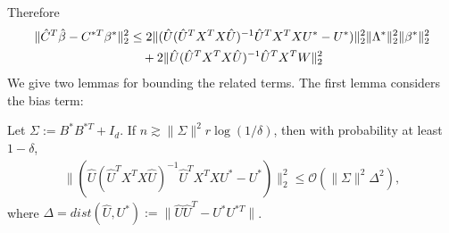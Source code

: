 Therefore 
\begin{align} \label{bias_variance_decom}
\|\hat{C}^{T}\hat{\beta}- C^{* T}\beta^{*}\|_{2}^{2} &\leq 2 \|(\hat{U}(\hat{U}^{T}X^{T}X\hat{U})^{-1}\hat{U}^{T}X^{T}X U^{*} - U^{*})\|_{2}^{2} \|\Lambda^{*}\|^2_2 \|\beta^{*}\|_{2}^{2}   \notag \\
& \quad + 2\|\hat{U}(\hat{U}^{T}X^{T}X\hat{U})^{-1}\hat{U}^{T}X^{T} W\|_{2}^{2}
\end{align}
We give two lemmas for bounding the related terms. The first lemma considers the bias term: 
\begin{lemma} \label{bias_term}
Let $\Sigma :=B^{*}B^{* T}+I_{d} $. If $n \gtrsim \|\Sigma\|^{2} r \log (1/\delta)$, then with probability at least $1-\delta$, 
\begin{align}
\|(\hat{U}(\hat{U}^{T}X^{T}X\hat{U})^{-1}\hat{U}^{T}X^{T}X U^{*} - U^{*})\|_{2}^{2} \leq \mathcal{O} (\|\Sigma\|^{2} \Delta^{2}),    
\end{align}
where $\Delta=dist(\hat{U},U^{*}):=\|\hat{U}\hat{U}^{T}-U^{*}U^{* T} \| $. 
\end{lemma}

